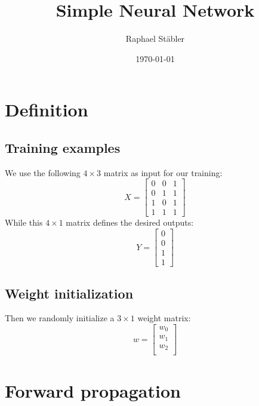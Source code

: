 \documentclass[10pt,a4paper]{article}
\author{Raphael St\"abler}
\title{Simple Neural Network}
\date{\today{}}
\begin{document}
\begin{titlepage}
	\maketitle
	\thispagestyle{empty}
\end{titlepage}

\newpage

\section{Definition}
\subsection{Training examples}
We use the following $4 \times 3$ matrix as input for our training:
\begin{equation}
	X =
	\begin{bmatrix}
		0 & 0 & 1 \\
		0 & 1 & 1 \\
		1 & 0 & 1 \\
		1 & 1 & 1
	\end{bmatrix}
\end{equation}	
While this $4 \times 1$ matrix defines the desired outputs:
\begin{equation}
	Y =
	\begin{bmatrix}
		0 \\
		0 \\
		1 \\
		1
	\end{bmatrix}
\end{equation}
\subsection{Weight initialization}
Then we randomly initialize a $3 \times 1$ weight matrix:
\begin{equation}
	w =
	\begin{bmatrix}
		w_0 \\
		w_1 \\
		w_2 \\
	\end{bmatrix}
\end{equation}

\section{Forward propagation}
\end{document}
